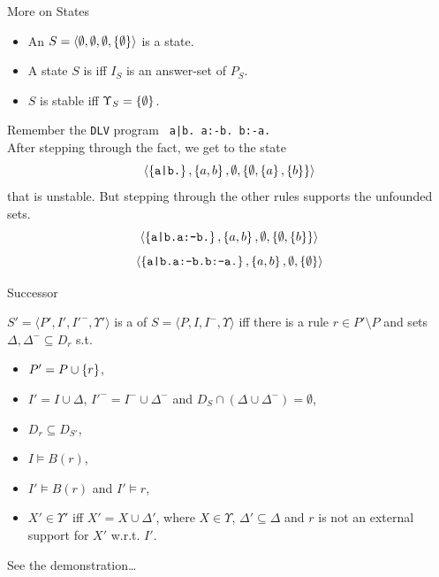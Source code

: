 \documentclass[trans,draft]{beamer} %
\begin{document}
\begin{frame}{More on States}

	\begin{itemize}
		\item An \emph{} $S = \langle \emptyset, \emptyset, \emptyset, \left\{{\emptyset}\right\} \rangle$ is a state.
		\item A state $S$ is \emph{} iff $I_S$ is an answer-set of $P_S$.
		\item $S$ is stable iff $\Upsilon_S = \left\{{\emptyset}\right\}$.
	\end{itemize}

	\pause

	\begin{example}
	Remember the \texttt{DLV} program \texttt{ a|b. a:-b. b:-a.}\\
	\pause
	After stepping through the fact, we get to the state
	$$\langle \left\{{\texttt{a|b.}}\right\}, \left\{{a,b}\right\}, \emptyset, \left\{{\emptyset,\left\{{a}\right\},\left\{{b}\right\}}\right\} \rangle$$
	that is unstable.
	\pause
	But stepping through the other rules supports the unfounded sets.
	$$\langle \left\{{\texttt{a|b.a:-b.}}\right\}, \left\{{a,b}\right\}, \emptyset, \left\{{\emptyset,\left\{{b}\right\}}\right\} \rangle$$
	$$\langle \left\{{\texttt{a|b.a:-b.b:-a.}}\right\}, \left\{{a,b}\right\}, \emptyset, \left\{{\emptyset}\right\} \rangle$$
	\end{example}

\end{frame}

\begin{frame}{Successor}

	\begin{definition}[successor]
	$S' = \langle P', I', I'^-, \Upsilon' \rangle$ is a \emph{} of $S = \langle P, I, I^-, \Upsilon \rangle$ iff\newline
	there is a rule $r \in P' \setminus P$ and sets $\Delta, \Delta^- \subseteq D_r$ s.t.
	\begin{itemize}
		\item $P' = P \cup \left\{{r}\right\}$,
		\item $I' = I \cup \Delta$, $I'^- = I^- \cup \Delta^-$ and $D_S \cap (\Delta \cup \Delta^-) = \emptyset$,
		\item $D_r \subseteq D_{S'}$,
		\item $I \models B(r)$,
		\item $I' \models B(r)$ and $I' \models r$,
		\item $X' \in \Upsilon'$ iff $X' = X \cup \Delta'$, where
		$X \in \Upsilon$, $\Delta' \subseteq \Delta$ and
		$r$ is not an external support for $X'$ w.r.t. $I'$.
	\end{itemize}
	\end{definition}

	\pause

	\begin{example}[s]
	See the demonstration\ldots
	\end{example}

\end{frame}
\end{document}
